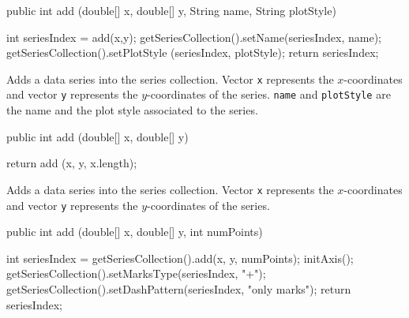 \begin{code}

   public int add (double[] x, double[] y, String name, String plotStyle) \begin{hide} {
      int seriesIndex = add(x,y);
      getSeriesCollection().setName(seriesIndex, name);
      getSeriesCollection().setPlotStyle (seriesIndex, plotStyle);
      return seriesIndex;
   }\end{hide}
\end{code}
\begin{tabb}
   Adds a data series into the series collection. Vector \texttt{x} represents
   the $x$-coordinates and vector \texttt{y} represents the $y$-coordinates of
   the series. \texttt{name} and \texttt{plotStyle} are the name and the plot
   style associated to the series.
\end{tabb}
\begin{htmlonly}
\end{htmlonly}
\begin{code}

   public int add (double[] x, double[] y) \begin{hide} {
      return add (x, y, x.length);
   }\end{hide}
\end{code}
\begin{tabb}
   Adds a data series into the series collection. Vector \texttt{x} represents
   the $x$-coordinates and vector \texttt{y} represents the $y$-coordinates of
   the series.
\end{tabb}
\begin{htmlonly}
\end{htmlonly}
\begin{code}

   public int add (double[] x, double[] y, int numPoints) \begin{hide} {
      int seriesIndex = getSeriesCollection().add(x, y, numPoints);
      initAxis();
      getSeriesCollection().setMarksType(seriesIndex, "+");
      getSeriesCollection().setDashPattern(seriesIndex, "only marks");
      return seriesIndex;
   }\end{hide}
\end{code}
